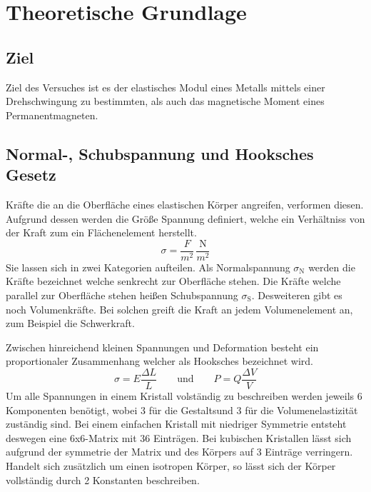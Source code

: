 \section{Theoretische Grundlage}
\label{sec:Theorie}
\subsection{Ziel}
Ziel des Versuches ist es der elastisches Modul eines Metalls mittels einer Drehschwingung zu bestimmten, als auch das magnetische Moment eines Permanentmagneten.
\subsection{Normal-, Schubspannung und Hooksches Gesetz}
Kräfte die an die Oberfläche eines elastischen Körper angreifen, verformen diesen. Aufgrund dessen werden die Größe Spannung definiert, welche ein Verhältniss von der Kraft zum ein Flächenelement herstellt.
\begin{equation}
  \sigma = \frac{F}{m^2} \, \frac{\text{N}}{m^2}
  \label{eqn:Spannung}
\end{equation}
Sie lassen sich in zwei Kategorien aufteilen. Als Normalspannung $\sigma_\text{N}$ werden die Kräfte bezeichnet welche senkrecht zur Oberfläche stehen. Die Kräfte welche parallel zur Oberfläche stehen heißen Schubspannung $\sigma_\text{S}$. Desweiteren gibt es noch Volumenkräfte. Bei solchen greift die Kraft an jedem Volumenelement an, zum Beispiel die Schwerkraft.

Zwischen hinreichend kleinen Spannungen und Deformation besteht ein proportionaler Zusammenhang welcher als Hooksches bezeichnet wird.
\begin{equation}
  \sigma = E \frac{\Delta L}{L}  \hspace{2em} \text{und} \hspace{2em} P = Q\frac{\Delta V}{V}
  \label{eqn:Hook}
\end{equation}
Um alle Spannungen in einem Kristall volständig zu beschreiben werden jeweils 6 Komponenten benötigt, wobei 3 für die Gestaltsund 3 für die Volumenelastizität zuständig sind. Bei einem einfachen  Kristall mit niedriger Symmetrie entsteht deswegen eine 6x6-Matrix mit 36 Einträgen. Bei kubischen Kristallen lässt sich aufgrund der symmetrie der Matrix und des Körpers auf 3 Einträge verringern. Handelt sich zusätzlich um einen isotropen Körper, so lässt sich der Körper vollständig durch 2 Konstanten beschreiben.

